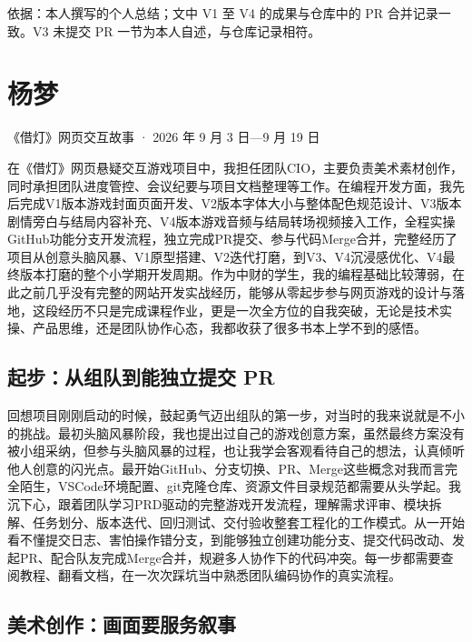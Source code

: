 \bigskip
{\small\color{black!55} 依据：本人撰写的个人总结；文中 V1 至 V4 的成果与仓库中的 PR 合并记录一致。V3 未提交 PR 一节为本人自述，与仓库记录相符。\par}


\section{杨梦}

{\small\color{black!55}《借灯》网页交互故事 · 2026 年 9 月 3 日—9 月 19 日\par}

在《借灯》网页悬疑交互游戏项目中，我担任团队CIO，主要负责美术素材创作，同时承担团队进度管控、会议纪要与项目文档整理等工作。在编程开发方面，我先后完成V1版本游戏封面页面开发、V2版本字体大小与整体配色规范设计、V3版本剧情旁白与结局内容补充、V4版本游戏音频与结局转场视频接入工作，全程实操GitHub功能分支开发流程，独立完成PR提交、参与代码Merge合并，完整经历了项目从创意头脑风暴、V1原型搭建、V2迭代打磨，到V3、V4沉浸感优化、V4最终版本打磨的整个小学期开发周期。作为中财的学生，我的编程基础比较薄弱，在此之前几乎没有完整的网站开发实战经历，能够从零起步参与网页游戏的设计与落地，这段经历不只是完成课程作业，更是一次全方位的自我突破，无论是技术实操、产品思维，还是团队协作心态，我都收获了很多书本上学不到的感悟。

\subsection{起步：从组队到能独立提交 PR}

回想项目刚刚启动的时候，鼓起勇气迈出组队的第一步，对当时的我来说就是不小的挑战。最初头脑风暴阶段，我也提出过自己的游戏创意方案，虽然最终方案没有被小组采纳，但参与头脑风暴的过程，也让我学会客观看待自己的想法，认真倾听他人创意的闪光点。最开始GitHub、分支切换、PR、Merge这些概念对我而言完全陌生，VSCode环境配置、git克隆仓库、资源文件目录规范都需要从头学起。我沉下心，跟着团队学习PRD驱动的完整游戏开发流程，理解需求评审、模块拆解、任务划分、版本迭代、回归测试、交付验收整套工程化的工作模式。从一开始看不懂提交日志、害怕操作错分支，到能够独立创建功能分支、提交代码改动、发起PR、配合队友完成Merge合并，规避多人协作下的代码冲突。每一步都需要查阅教程、翻看文档，在一次次踩坑当中熟悉团队编码协作的真实流程。

\subsection{美术创作：画面要服务叙事}

